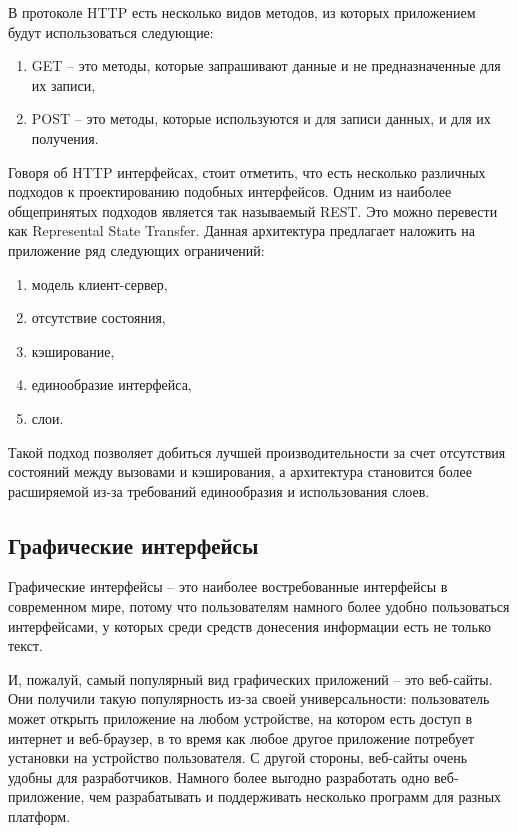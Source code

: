 В протоколе HTTP есть несколько видов методов, из которых приложением будут использоваться следующие:

\begin{enumerate}
    \item GET -- это методы, которые запрашивают данные и не предназначенные для их записи,
    \item POST -- это методы, которые используются и для записи данных, и для их получения.
\end{enumerate}

Говоря об HTTP интерфейсах, стоит отметить, что есть несколько различных подходов к проектированию
подобных интерфейсов. Одним из наиболее общепринятых подходов является так называемый REST.
Это можно перевести как Represental State Transfer\cite{REST}. Данная архитектура предлагает
наложить на приложение ряд следующих ограничений:

\begin{enumerate}
    \item модель клиент-сервер,
    \item отсутствие состояния,
    \item кэширование,
    \item единообразие интерфейса,
    \item слои.
\end{enumerate}

Такой подход позволяет добиться лучшей производительности за счет отсутствия состояний между
вызовами и кэширования, а архитектура становится более расширяемой из-за требований
единообразия и использования слоев.

\subsection*{Графические интерфейсы}

Графические интерфейсы -- это наиболее востребованные интерфейсы в современном мире, потому
что пользователям намного более удобно пользоваться интерфейсами, у которых среди
средств донесения информации есть не только текст. 

И, пожалуй, самый популярный вид графических приложений -- это веб-сайты.
Они получили такую популярность из-за своей универсальности: пользователь
может открыть приложение на любом устройстве, на котором есть доступ в интернет
и веб-браузер, в то время как любое другое приложение потребует установки
на устройство пользователя. С другой стороны, веб-сайты очень удобны для
разработчиков. Намного более выгодно разработать одно веб-приложение, чем
разрабатывать и поддерживать несколько программ для разных платформ.

